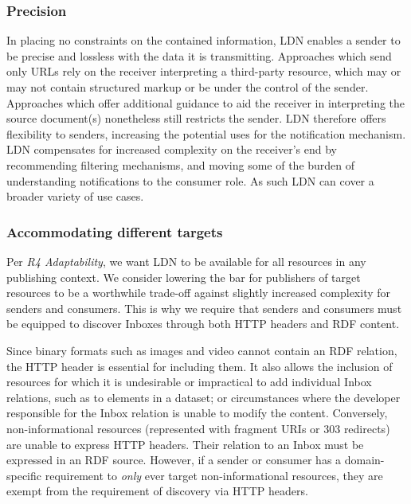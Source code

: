 \documentclass[]{article}
\begin{document}
\subsubsection{Precision}\label{precision}

In placing no constraints on the contained information, LDN enables a
sender to be precise and lossless with the data it is transmitting.
Approaches which send only URLs rely on the receiver interpreting a
third-party resource, which may or may not contain structured markup or
be under the control of the sender. Approaches which offer additional
guidance to aid the receiver in interpreting the source document(s)
nonetheless still restricts the sender. LDN therefore offers flexibility
to senders, increasing the potential uses for the notification
mechanism. LDN compensates for increased complexity on the receiver's
end by recommending filtering mechanisms, and moving some of the burden
of understanding notifications to the consumer role. As such LDN can
cover a broader variety of use cases.

\hypertarget{accommodating-different-targets}{}
\subsubsection{Accommodating different
targets}\label{accommodating-different-targets}

Per \emph{R4 Adaptability}, we want LDN to be available for all
resources in any publishing context. We consider lowering the bar for
publishers of target resources to be a worthwhile trade-off against
slightly increased complexity for senders and consumers. This is why we
require that senders and consumers must be equipped to discover Inboxes
through both HTTP headers and RDF content.

Since binary formats such as images and video cannot contain an RDF
relation, the HTTP header is essential for including them. It also
allows the inclusion of resources for which it is undesirable or
impractical to add individual Inbox relations, such as to elements in a
dataset; or circumstances where the developer responsible for the Inbox
relation is unable to modify the content. Conversely, non-informational
resources (represented with fragment URIs or 303 redirects) are unable
to express HTTP headers. Their relation to an Inbox must be expressed in
an RDF source. However, if a sender or consumer has a domain-specific
requirement to \emph{only} ever target non-informational resources, they
are exempt from the requirement of discovery via HTTP headers.
\end{document}
